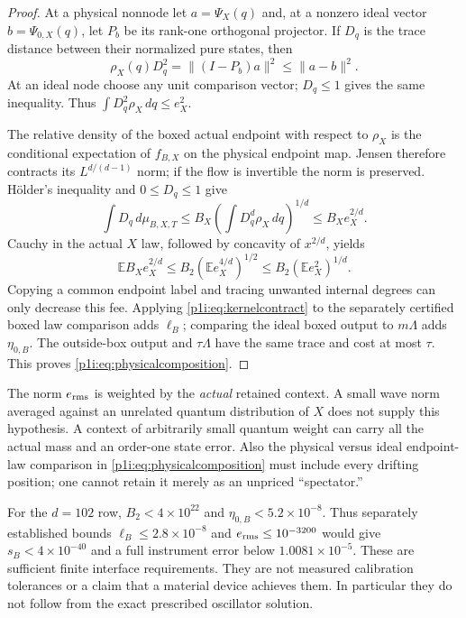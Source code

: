 \documentclass[11pt]{article}
\numberwithin{equation}{section}
\theoremstyle{definition}
\theoremstyle{remark}
\begin{document}
\begin{proof}
At a physical nonnode let $a=\Psi_X(q)$ and, at a nonzero ideal vector
$b=\Psi_{0,X}(q)$, let $P_b$ be its rank-one orthogonal projector. If
$D_q$ is the trace distance between their normalized pure states, then
\[
 \rho_X(q)D_q^2=\|(I-P_b)a\|^2
                         \leq\|a-b\|^2.
\]
At an ideal node choose any unit comparison vector; $D_q\leq1$ gives
the same inequality. Thus $\int D_q^2\rho_X\,dq\leq e_X^2$.

The relative density of the boxed actual endpoint with respect to
$\rho_X$ is the conditional expectation of $f_{B,X}$ on the physical
endpoint map. Jensen therefore contracts its $L^{d/(d-1)}$ norm; if the
flow is invertible the norm is preserved. H\"older's inequality and
$0\leq D_q\leq1$ give
\[
 \int D_q\,d\mu_{B,X,T}
 \leq B_X\left(\int D_q^d\rho_X\,dq\right)^{1/d}
 \leq B_X e_X^{2/d}.
\]
Cauchy in the actual $X$ law, followed by concavity of $x^{2/d}$, yields
\[
 \mathbb E B_Xe_X^{2/d}
 \leq B_2(\mathbb E e_X^{4/d})^{1/2}
 \leq B_2(\mathbb E e_X^2)^{1/d}.
\]
Copying a common endpoint label and tracing unwanted internal degrees
can only decrease this fee. Applying
\eqref{p1i:eq:kernelcontract} to the separately certified boxed law
comparison adds $\ell_B$; comparing the ideal boxed output to
$m\Lambda$ adds $\eta_{0,B}$. The outside-box output and $\tau\Lambda$
have the same trace and cost at most $\tau$. This proves
\eqref{p1i:eq:physicalcomposition}.
\end{proof}

The norm $e_{\rm rms}$ is weighted by the \emph{actual} retained context.
A small wave norm averaged against an unrelated quantum distribution of
$X$ does not supply this hypothesis. A context of arbitrarily small
quantum weight can carry all the actual mass and an order-one state
error. Also the physical versus ideal endpoint-law comparison in
\eqref{p1i:eq:physicalcomposition} must include every drifting position;
one cannot retain it merely as an unpriced ``spectator.''

For the $d=102$ row, $B_2<4\times10^{22}$ and
$\eta_{0,B}<5.2\times10^{-8}$. Thus separately established bounds
$\ell_B\leq2.8\times10^{-8}$ and $e_{\rm rms}\leq10^{-3200}$ would give
$s_B<4\times10^{-40}$ and a full instrument error below
$1.0081\times10^{-5}$. These are sufficient finite interface
requirements. They are not measured calibration tolerances or a claim
that a material device achieves them. In particular they do not follow
from the exact prescribed oscillator solution.
\end{document}
